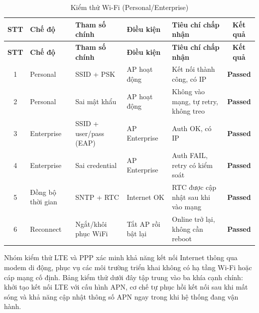         \begin{longtable}{|c|p{2cm}|p{3.5cm}|p{2.5cm}|p{4cm}|c|}
            \caption{Kiểm thử Wi-Fi (Personal/Enterprise)}
            \label{tab:test_wifi} \\
            \hline
            \textbf{STT} & \textbf{Chế độ} & \textbf{Tham số chính} & \textbf{Điều kiện} & \textbf{Tiêu chí chấp nhận} & \textbf{Kết quả} \\ \hline
            \endfirsthead

            \hline
            \textbf{STT} & \textbf{Chế độ} & \textbf{Tham số chính} & \textbf{Điều kiện} & \textbf{Tiêu chí chấp nhận} & \textbf{Kết quả} \\ \hline
            \endhead

            \hline
            \endfoot
            \endlastfoot

            1 & Personal & SSID + PSK & AP hoạt động & Kết nối thành công, có IP & \textcolor{modern_blue}{\textbf{Passed}} \\ \hline
            2 & Personal & Sai mật khẩu & AP hoạt động & Không vào mạng, tự retry, không treo & \textcolor{modern_blue}{\textbf{Passed}} \\ \hline
            3 & Enterprise & SSID + user/pass (EAP) & AP Enterprise & Auth OK, có IP & \textcolor{modern_blue}{\textbf{Passed}} \\ \hline
            4 & Enterprise & Sai credential & AP Enterprise & Auth FAIL, retry có kiểm soát & \textcolor{modern_blue}{\textbf{Passed}} \\ \hline
            5 & Đồng bộ thời gian & SNTP + RTC & Internet OK & RTC được cập nhật sau khi vào mạng & \textcolor{modern_blue}{\textbf{Passed}} \\ \hline
            6 & Reconnect & Ngắt/khôi phục WiFi & Tắt AP rồi bật lại & Online trở lại, không cần reboot & \textcolor{modern_blue}{\textbf{Passed}} \\ \hline
        \end{longtable}

        Nhóm kiểm thử LTE và PPP xác minh khả năng kết nối Internet thông qua modem di động, phục vụ các môi trường triển khai không có hạ tầng Wi-Fi hoặc cáp mạng cố định. Bảng kiểm thử dưới đây tập trung vào ba khía cạnh chính: khởi tạo kết nối LTE với cấu hình APN, cơ chế tự phục hồi kết nối sau khi mất sóng và khả năng cập nhật thông số APN ngay trong khi hệ thống đang vận hành.


